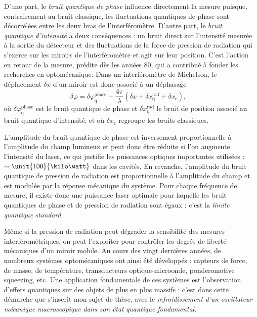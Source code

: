 \documentclass[12pt,a4paper]{article}
\begin{document}
D'une part, le \textit{bruit quantique de phase} influence directement la mesure puisque, contrairement au bruit classique, les fluctuations quantiques de phase sont décorrélées entre les deux bras de l'interféromètre.
D'autre part, le \textit{bruit quantique d'intensité} a deux conséquences : un bruit direct sur l'intensité mesurée à la sortie du détecteur et des fluctuations de la force de pression de radiation qui s'exerce sur les miroirs de l'interféromètre et agit sur leur position.
C'est l'action en retour de la mesure, prédite dès les années 80, qui a contribué à fonder les recherches en optomécanique.
Dans un interféromètre de Michelson, le déplacement $\delta x$ d'un miroir est donc associé à un déphasage
\begin{equation}
\delta \varphi = \delta \varphi ^\mathrm{phase} _\mathrm{q} + \frac{4\pi}{\lambda} ( \delta x + \delta x ^\mathrm{rad} _\mathrm{q} + \delta x_\mathrm{c}),
\label{eq:disp}
\end{equation}
où $\delta \varphi ^\mathrm{phase} _\mathrm{q}$ est le bruit quantique de phase et $\delta x ^\mathrm{rad} _\mathrm{q}$ le bruit de position associé au bruit quantique d'intensité, et où $\delta x_\mathrm{c}$ regroupe les bruits classiques.

L'amplitude du bruit quantique de phase est inversement proportionnelle à l'amplitude du champ lumineux et peut donc être réduite si l'on augmente l'intensité du laser, ce qui justifie les puissances optiques importantes utilisées : $\sim \unit{100}{\kilo\watt}$ dans les cavités.
En revanche, l'amplitude du bruit quantique de pression de radiation est proportionnelle à l'amplitude du champ et est modulée par la réponse mécanique du système.
Pour chaque fréquence de mesure, il existe donc une puissance laser optimale pour laquelle les bruit quantiques de phase et de pression de radiation sont égaux : c'est la \textit{limite quantique standard}.

Même si la pression de radiation peut dégrader la sensibilité des mesures interférométriques, on peut l'exploiter pour contrôler les degrés de liberté mécaniques d'un miroir mobile.
Au cours des vingt dernières années, de nombreux systèmes optomécaniques ont ainsi été développés : capteurs de force, de masse, de température, transducteurs optique-microonde, ponderomotive squeezing, etc.
Une application fondamentale de ces systèmes est l'observation d'effets quantiques sur des objets de plus en plus massifs : c'est dans cette démarche que s'inscrit mon sujet de thèse, avec le \textit{refroidissement d'un oscillateur mécanique macroscopique dans son état quantique fondamental}.
\end{document}
